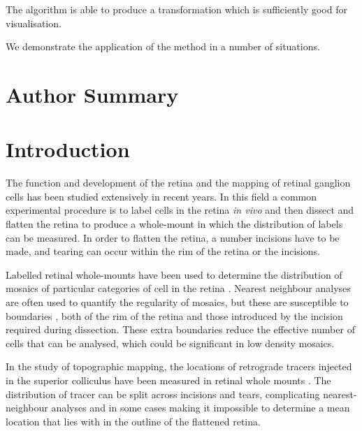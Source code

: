 \documentclass[10pt]{article}
\begin{document}
The algorithm is able to produce a transformation which is
sufficiently good for visualisation.  

We demonstrate the application of the method in a number of
situations. 

\section*{Author Summary}

\section*{Introduction}

The function and development of the retina and the mapping of retinal
ganglion cells has been studied extensively in recent years. In this
field a common experimental procedure is to label cells in the retina
\emph{in vivo} and then dissect and flatten the retina to produce a
whole-mount in which the distribution of labels can be measured. In
order to flatten the retina, a number incisions have to be made, and
tearing can occur within the rim of the retina or the incisions.

Labelled retinal whole-mounts have been used to determine the
distribution of mosaics of particular categories of cell in the
retina \cite{WassBoyc91func,RaveEtal03dete}.  Nearest neighbour
analyses are often used to quantify the regularity of mosaics, but
these are susceptible to boundaries \cite{Cook96spat}, both of the rim
of the retina and those introduced by the incision required during
dissection. These extra boundaries reduce the effective number of
cells that can be analysed, which could be significant in low density
mosaics. 

In the study of topographic mapping, the locations of retrograde
tracers injected in the superior colliculus have been measured in
retinal whole mounts \cite{RebeEtal04rela,RashEtal05oppo}. The
distribution of tracer can be split across incisions and tears,
complicating nearest-neighbour analyses and in some cases making it
impossible to determine a mean location that lies with in the outline
of the flattened retina.
\end{document}
